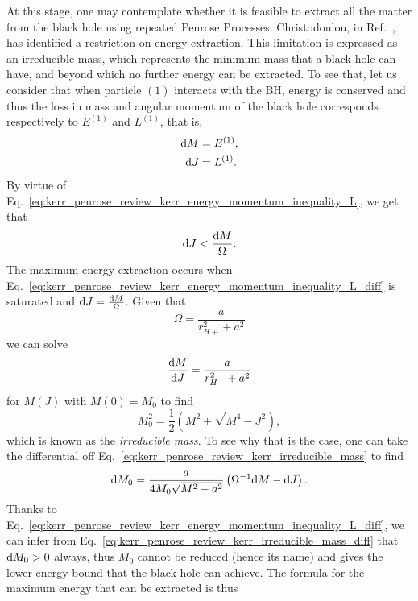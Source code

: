 At this stage, one may contemplate whether it is feasible to extract all the matter from the black hole using repeated Penrose Processes. Christodoulou, in Ref.~\cite{CHRISTODOULOU1970}, has identified a restriction on energy extraction. This limitation is expressed as an irreducible mass, which represents the minimum mass that a black hole can have, and beyond which no further energy can be extracted. To see that, let us consider that when particle $(1)$ interacts with the \ac{BH}, energy is conserved and thus the loss in mass and angular momentum of the black hole corresponds respectively to $E^{(1)}$ and $L^{(1)}$, that is,
%
\begin{align}
  \mathrm{d} M & = E^{(1)} \label{eq:kerr_penrose_review_kerr_mass_change}, \\
  \mathrm{d} J & = L^{(1)} \label{eq:kerr_penrose_review_kerr_L_change}.
\end{align}
%
By virtue of Eq.~\eqref{eq:kerr_penrose_review_kerr_energy_momentum_inequality_L}, we get that
%
\begin{equation}
  \mathrm{d} J < \frac{\mathrm{d} M}{\Omega}.
  \label{eq:kerr_penrose_review_kerr_energy_momentum_inequality_L_diff}
\end{equation}
%
The maximum energy extraction occurs when Eq.~\eqref{eq:kerr_penrose_review_kerr_energy_momentum_inequality_L_diff} is saturated and $\mathrm{d} J = \frac{\mathrm{d} M}{\Omega}$. Given that
%
\begin{equation}
  \Omega = \frac{a}{r_{H+}^2 + a^2}
  \label{eq:kerr_penrose_review_kerr_angular_momentum_def}
\end{equation}
%
we can solve
%
\begin{equation}
  \frac{\mathrm{d} M}{\mathrm{d} J} = \frac{a}{r_{H+}^2 + a^2}
  \label{eq:kerr_penrose_review_kerr_mass_ODE}
\end{equation}
%
for $M(J)$ with $M(0) = M_0$ to find
%
\begin{equation}
  M_0^2 = \frac{1}{2}\left( M^2 + \sqrt{M^4 - J^2} \right),
  \label{eq:kerr_penrose_review_kerr_irreducible_mass}
\end{equation}
%
which is known as the \emph{irreducible mass}. To see why that is the case, one can take the differential off Eq.~\eqref{eq:kerr_penrose_review_kerr_irreducible_mass} to find
%
\begin{equation}
  \mathrm{d} M_0 = \frac{a}{4 M_0 \sqrt{M^2 - a^2}}\left( \Omega^{-1} \mathrm{d} M - \mathrm{d} J \right).
  \label{eq:kerr_penrose_review_kerr_irreducible_mass_diff}
\end{equation}
%
Thanks to Eq.~\eqref{eq:kerr_penrose_review_kerr_energy_momentum_inequality_L_diff}, we can infer from Eq.~\eqref{eq:kerr_penrose_review_kerr_irreducible_mass_diff} that $\mathrm{d} M_0 > 0$ always, thus $M_0$ cannot be reduced (hence its name) and gives the lower energy bound that the black hole can achieve. The formula for the maximum energy that can be extracted is thus
